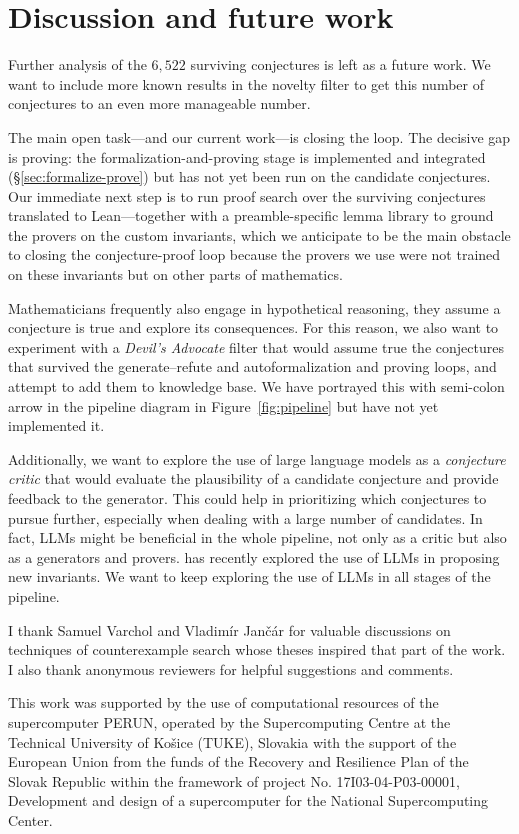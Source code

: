 \documentclass[]{ceurart}
\begin{document}
\section{Discussion and future work}
\label{sec:conclusion}

Further analysis of the $6{,}522$ surviving conjectures is left as a future work. We want to include more known results in the novelty filter to get this number of conjectures to an even more manageable number.

The main open task---and our current work---is closing the loop. The decisive gap is
proving: the formalization-and-proving stage is implemented and integrated
(\S\ref{sec:formalize-prove}) but has not yet been run on the candidate conjectures. Our immediate next
step is to run proof search over the surviving conjectures translated to Lean---together with a preamble-specific
lemma library to ground the provers on the custom invariants, which we anticipate to be the main obstacle
to closing the conjecture-proof loop because the provers we use were not trained on these invariants but on other parts of mathematics.

Mathematicians frequently also engage in hypothetical reasoning, they assume a conjecture is true and explore its consequences. For this reason, we also want to experiment with a \emph{Devil's Advocate} filter that would assume true the conjectures that survived the generate--refute and autoformalization and proving loops, and attempt to add them to knowledge base. We have portrayed this with semi-colon arrow in the pipeline diagram in Figure~\ref{fig:pipeline} but have not yet implemented it. 

Additionally, we want to explore the use of large language models as a \emph{conjecture critic} that would evaluate the plausibility of a candidate conjecture and provide feedback to the generator. This could help in prioritizing which conjectures to pursue further, especially when dealing with a large number of candidates. In fact, LLMs might be beneficial in the whole pipeline, not only as a critic but also as a generators and provers. \cite{davila2026graffiti3} has recently explored the use of LLMs in proposing new invariants. We want to keep exploring the use of LLMs in all stages of the pipeline.


\begin{acknowledgments}
  I thank Samuel Varchol and Vladimír Jančár for valuable discussions on techniques of counterexample search whose theses inspired that part of the work. I also thank anonymous reviewers for helpful suggestions and comments. 

  This work was supported by the use of computational resources of the supercomputer PERUN, operated by the Supercomputing Centre at the Technical University of Košice (TUKE), Slovakia with the support of the European Union from the funds of the Recovery and Resilience Plan of the Slovak Republic within the framework of project No. 17I03-04-P03-00001, Development and design of a supercomputer for the National Supercomputing Center.


\end{acknowledgments}
\end{document}
